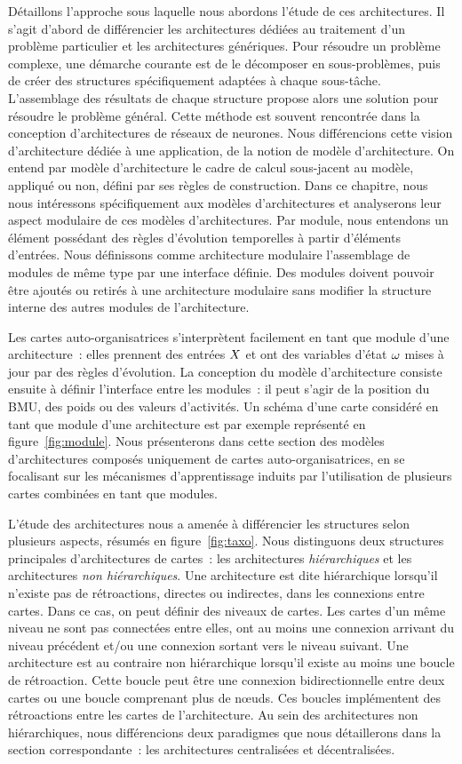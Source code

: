 \documentclass[../main]{subfiles}
\begin{document}
Détaillons l'approche sous laquelle nous abordons l'étude de ces architectures.
Il s'agit d'abord de différencier les architectures dédiées au traitement d'un problème particulier et les architectures génériques. 
Pour résoudre un problème complexe, une démarche courante est de le décomposer en sous-problèmes, puis de créer des structures spécifiquement adaptées à chaque sous-tâche. L'assemblage des résultats de chaque structure propose alors une solution pour résoudre le problème général. Cette méthode est souvent rencontrée dans la conception d'architectures de réseaux de neurones.
Nous différencions cette vision d'architecture dédiée à une application, de la notion de modèle d'architecture.
On entend par modèle d'architecture le cadre de calcul sous-jacent au modèle, appliqué ou non, défini par ses règles de construction.
Dans ce chapitre, nous nous intéressons spécifiquement aux modèles d'architectures et analyserons leur aspect modulaire de ces modèles d'architectures.
Par module, nous entendons un élément possédant des règles d'évolution temporelles à partir d'éléments d'entrées. Nous définissons comme architecture modulaire l'assemblage de modules de même type par une interface définie. Des modules doivent pouvoir être ajoutés ou retirés à une architecture modulaire sans modifier la structure interne des autres modules de l'architecture.


Les cartes auto-organisatrices s'interprètent facilement en tant que module d'une architecture~: elles prennent des entrées $X$ et ont des variables d'état $\omega$ mises à jour par des règles d'évolution. La conception du modèle d'architecture consiste ensuite à définir l'interface entre les modules~: il peut s'agir de la position du BMU, des poids ou des valeurs d'activités.
Un schéma d'une carte considéré en tant que module d'une architecture est par exemple représenté en figure~\ref{fig:module}. 
Nous présenterons dans cette section des modèles d'architectures composés uniquement de cartes auto-organisatrices, en se focalisant sur les mécanismes d'apprentissage induits par l'utilisation de plusieurs cartes combinées en tant que modules.

L'étude des architectures nous a amenée à différencier les structures selon plusieurs aspects, résumés en figure~\ref{fig:taxo}.
Nous distinguons deux structures principales d'architectures de cartes~: les architectures \emph{hiérarchiques} et les architectures \emph{non hiérarchiques}.
Une architecture est dite hiérarchique lorsqu'il n'existe pas de rétroactions, directes ou indirectes, dans les connexions entre cartes. Dans ce cas, on peut définir des niveaux de cartes. Les cartes d'un même niveau ne sont pas connectées entre elles, ont au moins une connexion arrivant du niveau précédent et/ou une connexion sortant vers le niveau suivant.
Une architecture est au contraire non hiérarchique lorsqu'il existe au moins une boucle de rétroaction. Cette boucle peut être une connexion bidirectionnelle entre deux cartes ou une boucle comprenant plus de n\oe{}uds. Ces boucles implémentent des rétroactions entre les cartes de l'architecture.
Au sein des architectures non hiérarchiques, nous différencions deux paradigmes que nous détaillerons dans la section correspondante~: les architectures centralisées et décentralisées.
\end{document}
